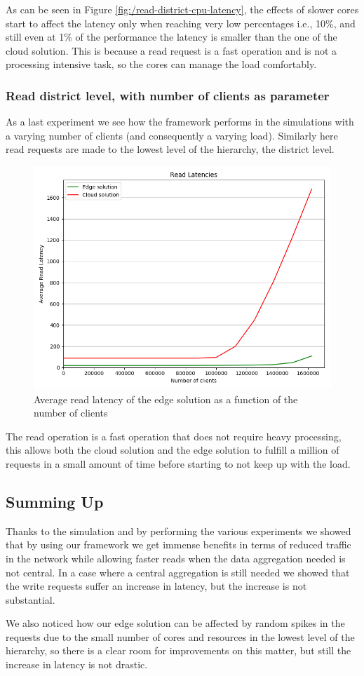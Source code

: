 As can be seen in Figure \ref{fig:/read-district-cpu-latency}, the effects of slower cores start to affect the latency only when reaching very low percentages i.e., 10\%, and still even at 1\% of the performance the latency is smaller than the one of the cloud solution. This is because a read request is a fast operation and is not a processing intensive task, so the cores can manage the load comfortably.

\subsubsection{Read district level, with number of clients as parameter}
As a last experiment we see how the framework performs in the simulations with a varying number of clients (and consequently a varying load).
Similarly here read requests are made to the lowest level of the hierarchy, the district level.

\begin{figure}[H]
    \centering
    \includegraphics[width=0.86\linewidth]{Figures/Evaluation/read-district-clients-latency.png}
    \caption{Average read latency of the edge solution as a function of the number of clients}
    \label{fig:/read-district-clients-latency}
\end{figure}

The read operation is a fast operation that does not require heavy processing, this allows both the cloud solution and the edge solution to fulfill a million of requests in a small amount of time before starting to not keep up with the load.

\subsection{Summing Up}
Thanks to the simulation and by performing the various experiments we showed that by using our framework we get immense benefits in terms of reduced traffic in the network while allowing faster reads when the data aggregation needed is not central.
In a case where a central aggregation is still needed we showed that the write requests suffer an increase in latency, but the increase is not substantial.

We also noticed how our edge solution can be affected by random spikes in the requests due to the small number of cores and resources in the lowest level of the hierarchy, so there is a clear room for improvements on this matter, but still the increase in latency is not drastic.

